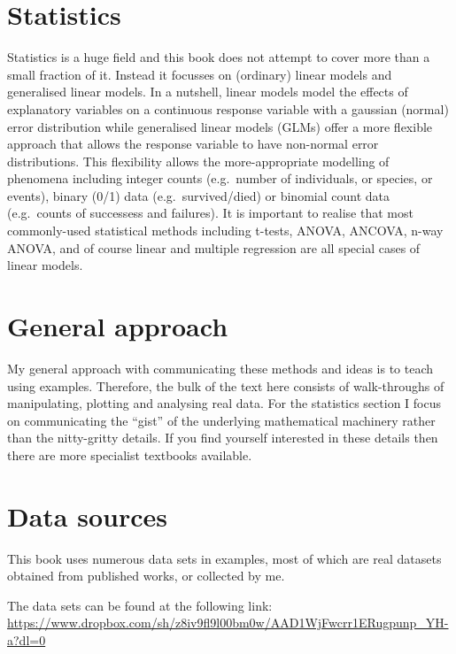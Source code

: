 \documentclass[
  a4paperpaper,
]{book}
\begin{document}
\hypertarget{statistics}{%
\section{Statistics}\label{statistics}}

Statistics is a huge field and this book does not attempt to cover more than a small fraction of it. Instead it focusses on (ordinary) linear models and generalised linear models. In a nutshell, linear models model the effects of explanatory variables on a continuous response variable with a gaussian (normal) error distribution while generalised linear models (GLMs) offer a more flexible approach that allows the response variable to have non-normal error distributions. This flexibility allows the more-appropriate modelling of phenomena including integer counts (e.g.~number of individuals, or species, or events), binary (0/1) data (e.g.~survived/died) or binomial count data (e.g.~counts of successess and failures). It is important to realise that most commonly-used statistical methods including t-tests, ANOVA, ANCOVA, n-way ANOVA, and of course linear and multiple regression are all special cases of linear models.

\hypertarget{general-approach}{%
\section{General approach}\label{general-approach}}

My general approach with communicating these methods and ideas is to teach using examples. Therefore, the bulk of the text here consists of walk-throughs of manipulating, plotting and analysing real data. For the statistics section I focus on communicating the ``gist'' of the underlying mathematical machinery rather than the nitty-gritty details. If you find yourself interested in these details then there are more specialist textbooks available.

\hypertarget{data-sources}{%
\section{Data sources}\label{data-sources}}

This book uses numerous data sets in examples, most of which are real datasets obtained from published works, or collected by me.

The data sets can be found at the following link:
\url{https://www.dropbox.com/sh/z8iv9fl9l00bm0w/AAD1WjFwcrr1ERugpunp_YH-a?dl=0}
\end{document}
